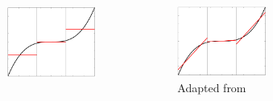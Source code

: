 \begin{frame}
\begin{columns}[t]
\begin{figure}[ht]
			\end{figure}
			\begin{figure}[htbp]
				\vspace{-0.6cm}
				\includegraphics[height=0.31\textheight]{img/fvm.pdf}
			\end{figure} 
			\begin{figure}[htbp]
				\vspace{-0.6cm}
				\includegraphics[height=0.31\textheight]{img/dg.pdf}
				\vspace{-0.1cm}
				\caption{Adapted from \cite{muller2014}}
			\end{figure} 
		\end{columns}
	\end{frame}

